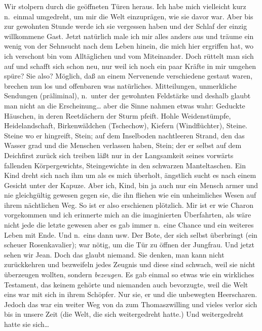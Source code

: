 \documentclass[
]{article}
\begin{document}
\begin{enumerate}
  Wir stolpern durch die geöffneten Türen heraus. Ich habe mich
  vielleicht kurz n.~einmal umgedreht, um mir die Welt einzuprägen, wie
  sie davor war. Aber bis zur gewohnten Stunde werde ich sie vergessen
  haben und der Schlaf der einzig willkommene Gast. Jetzt natürlich male
  ich mir alles anders aus und träume ein wenig von der Sehnsucht nach
  dem Leben hinein, die mich hier ergriffen hat, wo ich verschont bin
  vom Alltäglichen und vom Miteinander. Doch rüttelt man sich auf und
  schafft sich schon neu, nur weil ich noch ein paar Kräfte in mir
  umgehen spüre? Sie also? Möglich, daß an einem Nervenende verschiedene
  gestaut waren, brechen nun los und offenbaren was natürliches.
  Mitteilungen, unmerkliche Sendungen (präliminal), n.~unter der
  gewohnten Feldstärke und deshalb glaubt man nicht an die
  Erscheinung\ldots{} aber die Sinne nahmen etwas wahr: Geduckte
  Häuschen, in deren Reetdächern der Sturm pfeift. Hohle Weidenstümpfe,
  Heidelandschaft, Birkenwäldchen (Tschechow), Kiefern (Windflüchter),
  Steine. Steine wo er hingreift, Stein; auf dem Inselboden nachtleeren
  Strand, den das Wasser grad und die Menschen verlassen haben, Stein;
  der er selbst auf dem Deichfirst zurück sich treiben läßt nur in der
  Langsamkeit seines vorwärts fallenden Körpergewichts, Steingewichte in
  den schwarzen Manteltaschen. Ein Kind dreht sich nach ihm um als es
  mich überholt, ängstlich sucht es nach einem Gesicht unter der Kapuze.
  Aber ich, Kind, bin ja auch nur ein Mensch armer und nie gleichgültig
  gewesen gegen sie, die ihn fliehen wie ein unheimliches Wesen auf
  ihrem nächtlichen Weg. So ist er also erschienen plötzlich. Mir ist er
  wie Charon vorgekommen und ich erinnerte mich an die imaginierten
  Überfahrten, als wäre nicht jede die letzte gewesen aber es gab immer
  n.~eine Chance und ein weiteres Leben mit Ende. Und n.~eins dann usw.
  Der Bote, der sich selbst überbringt (ein scheuer Rosenkavalier); war
  nötig, um die Tür zu öffnen der Jungfrau. Und jetzt sehen wir Jean.
  Doch das glaubt niemand. Sie denken, man kann nicht zurückkehren und
  bezweifeln jedes Zeugnis und diese sind schwach, weil sie nicht
  überzeugen wollten, sondern \emph{bezeugen}. Es gab einmal so etwas
  wie ein wirkliches Testament, das keinem gehörte und niemanden auch
  bevorzugte, weil die Welt eins war mit sich in ihrem Schöpfer. Nur
  sie, er und die unbewegten Heerscharen. Jedoch das war ein weiter Weg
  von da zum Thomaszwilling und vieles verlor sich bis in unsere Zeit
  (die Welt, die sich weitergedreht hatte.) Und weitergedreht hatte sie
  sich\ldots{}
\end{enumerate}
\end{document}
